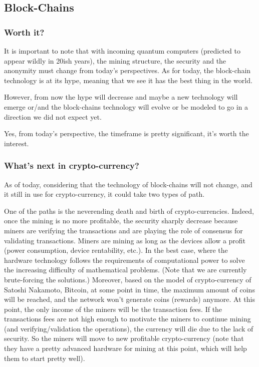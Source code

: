 
\subsection{Block-Chains}
\subsubsection{Worth it?}
It is important to note that with incoming quantum computers (predicted to appear wildly in 20ish years), the mining structure, the security and the anonymity must change from today's perspectives. 
As for today, the block-chain technology is at its hype, meaning that we see it has the best thing in the world.

However, from now the hype will decrease and maybe a new technology will emerge or/and the block-chains technology will evolve or be modeled to go in a direction we did not expect yet.

Yes, from today's perspective, the timeframe is pretty significant, it's worth the interest.

\subsubsection{What's next in crypto-currency?}

As of today, considering that the technology of block-chains will not change, and it still in use for crypto-currency, it could take two types of path.

One of the paths is the neverending death and birth of crypto-currencies. Indeed, once the mining is no more profitable, the security sharply decrease because miners are verifying the transactions and are playing the role of consensus for validating transactions. Miners are mining as long as the devices allow a profit (power consumption, device rentability, etc.). In the best case, where the hardware technology follows the requirements of computational power to solve the increasing difficulty of mathematical problems. (Note that we are currently brute-forcing the solutions.) Moreover, based on the model of crypto-currency of Satoshi Nakamoto, Bitcoin, at some point in time, the maximum amount of coins will be reached, and the network won't generate coins (rewards) anymore. At this point, the only income of the miners will be the transaction fees. If the transactions fees are not high enough to motivate the miners to continue mining (and verifying/validation the operations), the currency will die due to the lack of security. So the miners will move to new profitable crypto-currency (note that they have a pretty advanced hardware for mining at this point, which will help them to start pretty well).

